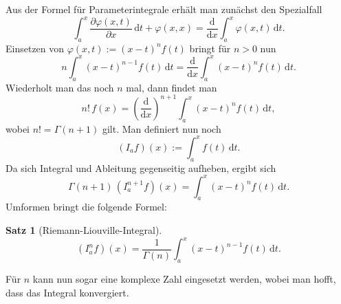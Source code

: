 \documentclass[a4paper,10pt,fleqn,twocolumn,twoside]{scrartcl}
\numberwithin{equation}{section}
\theoremstyle{rmbox}
\newtheorem{theorem}{Satz}
\begin{document}
Aus der Formel für Parameterintegrale erhält man
zunächst den Spezialfall%
\begin{equation}
\int_a^x \frac{\partial \varphi(x,t)}{\partial x}\,\mathrm dt+\varphi(x,x)
= \frac{\mathrm d}{\mathrm dx}\int_a^x \varphi(x,t)\,\mathrm dt.
\end{equation}
Einsetzen von $\varphi(x,t):=(x-t)^n f(t)$ bringt für $n>0$ nun
\begin{equation}
n\int_a^x (x-t)^{n-1}f(t)\,\mathrm dt
= \frac{\mathrm d}{\mathrm dx}\int_a^x (x-t)^n f(t)\,\mathrm dt.
\end{equation}
Wiederholt man das noch $n$ mal, dann findet man
\begin{equation}
n!\,f(x) =
\left(\frac{\mathrm d}{\mathrm dx}\right)^{n+1} \int_a^x (x-t)^n f(t)\,\mathrm dt,
\end{equation}
wobei $n!=\Gamma(n+1)$ gilt. Man definiert nun noch
\begin{equation}
(I_a f)(x) := \int_a^x f(t)\,\mathrm dt.
\end{equation}
Da sich Integral und Ableitung gegenseitig aufheben, ergibt sich
\begin{equation}
\Gamma(n+1)\, (I_a^{n+1}f)(x) = \int_a^x (x-t)^n f(t)\,\mathrm dt.
\end{equation}
Umformen bringt die folgende Formel:

\begin{theorem}[Riemann-Liouville-Integral]
\begin{equation}\label{eq:Riemann-Liouville-Integral}
(I_a^n f)(x) = \frac{1}{\Gamma(n)}\int_a^x (x-t)^{n-1}f(t)\,\mathrm dt.
\end{equation}
\end{theorem}
Für $n$ kann nun sogar eine komplexe Zahl eingesetzt werden, wobei
man hofft, dass das Integral konvergiert.

\end{document}
